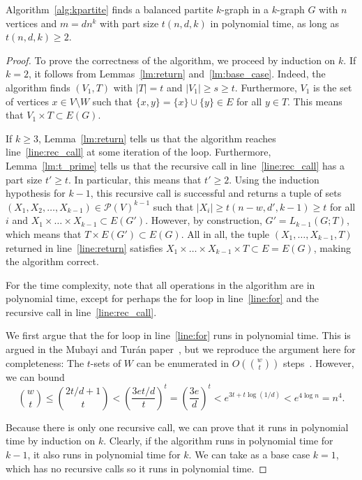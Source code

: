 \begin{theorem}
    Algorithm~\ref{alg:kpartite} finds a balanced partite $k$-graph in a $k$-graph $G$ with
    $n$ vertices and $m = d n^k$ with part size $t(n, d, k)$ in polynomial time,
    as long as $t(n, d, k) \geq 2$.
    \begin{proof}
        To prove the correctness of the algorithm, we proceed by induction on $k$.
        If $k=2$, it follows from Lemmas~\ref{lm:return} and~\ref{lm:base_case}.
        Indeed, the algorithm finds $(V_1, T)$ with $|T| = t$ and $|V_1| \geq s \geq t$.
        Furthermore, $V_1$ is the set of vertices $x \in V \setminus W$ such that
        $\{x, y\} = \{x\} \cup \{y\} \in E$ for all $y \in T$.
        This means that $V_1 \times T \subset E(G)$.

        If $k \geq 3$,
        Lemma~\ref{lm:return} tells us that the algorithm
        reaches line~\ref{line:rec_call} at some iteration of the loop.
        Furthermore, Lemma~\ref{lm:t_prime} tells us that the recursive call in line~\ref{line:rec_call}
        has a part size $t' \geq t$.
        In particular, this means that $t' \geq 2$.
        Using the induction hypothesis for $k-1$,
        this recursive call is successful and
        returns a tuple of sets
        $(X_1, X_2, \dots, X_{k-1}) \in \mathcal{P}(V)^{k-1}$ such that $|X_i| \geq t(n-w, d', k-1) \geq t$
        for all $i$ and $X_1 \times \dots \times X_{k-1} \subset E(G')$.
        However, by construction, $G' = L_{k-1}(G; T)$, which means that $T \times E(G') \subset E(G)$.
        All in all, the tuple $(X_1, \dots, X_{k-1}, T)$ returned in line~\ref{line:return}
        satisfies $X_1 \times \dots \times X_{k-1} \times T \subset E = E(G)$, making the algorithm correct.

        For the time complexity, note that all operations in the algorithm are in polynomial time, %
        except for perhaps the for loop in line~\ref{line:for} and the recursive call in line~\ref{line:rec_call}.

        We first argue that the for loop in line~\ref{line:for} runs in polynomial time.
        This is argued in the Mubayi and Turán paper~\cite{MUBAYI2010174},
        but we reproduce the argument here for completeness:
        The $t$-sets of $W$ can be enumerated in
        $O\left( \binom{w}{t} \right)$ steps~\cite{reingold1977combinatorial}.
        However, we can bound
        \[
            \binom{w}{t} \leq
            \binom{2t/d + 1}{t} <
            \left( \frac{3et/d}{t} \right)^{t} =
            \left( \frac{3e}{d} \right)^{t} <
            e^{3 t + t \log (1/d)} <
            e^{4 \log n} = n^4.
        \]

        Because there is only one recursive call, we can prove that it runs in polynomial time
        by induction on $k$.
        Clearly, if the algorithm runs in polynomial time for $k-1$,
        it also runs in polynomial time for $k$.
        We can take as a base case $k=1$, which has no recursive calls so
        it runs in polynomial time.

    \end{proof}
\end{theorem}






